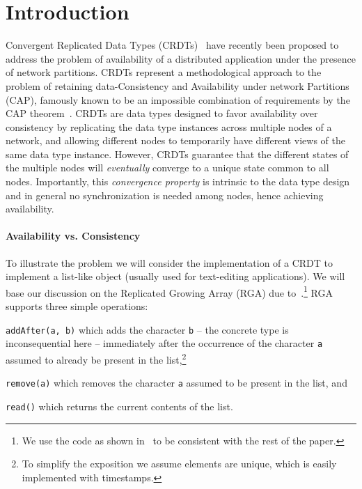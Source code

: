 \section{Introduction}
\label{sec:introduction}

Convergent Replicated Data Types (CRDTs)~\cite{ShapiroPBZ11} have
recently been proposed to address the problem of availability of a
distributed application under the presence of network partitions.
%
CRDTs represent a methodological approach to the problem of retaining
data-Consistency and Availability under network Partitions (CAP),
famously known to be an impossible combination of requirements by the
CAP theorem~\cite{GilbertL02}.
%
CRDTs are data types designed to favor availability over consistency
by replicating the data type instances across multiple nodes of a
network, and allowing different nodes to temporarily have different
views of the same data type instance.
%
However, CRDTs guarantee that the different states of the multiple
nodes will \emph{eventually} converge to a unique state common to all
nodes.
%
Importantly, this \emph{convergence property} is intrinsic to the data
type design and in general no synchronization is needed among nodes,
hence achieving availability.

\paragraph{Availability vs. Consistency}
To illustrate the problem we will consider the implementation of a
CRDT to implement a list-like object (usually used for text-editing
applications).
%
We will base our discussion on the Replicated Growing Array (RGA) due
to~\cite{RohJKL11}.\footnote{We use the code as shown
  in~\cite{ShapiroPBZ11} to be consistent with the rest of the paper.}
%
RGA supports three simple operations:
\begin{inparaenum}
\item \lstinline|addAfter(a, b)| which adds the character
  \lstinline|b| -- the concrete type is inconsequential here --
  immediately after the occurrence of the character \lstinline|a|
  assumed to already be present in the list,\footnote{To simplify the
    exposition we assume elements are unique, which is easily implemented
    with timestamps.}
\item \lstinline|remove(a)| which removes the character \lstinline|a|
  assumed to be present in the list, and
\item \lstinline|read()| which returns the current contents of the
  list.
\end{inparaenum}

